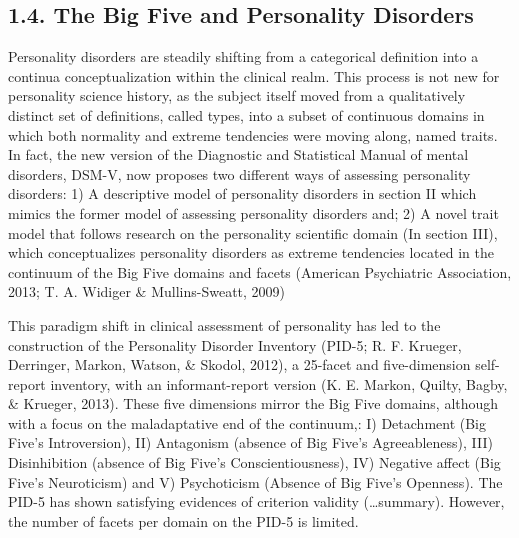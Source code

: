 \documentclass[,man,floatsintext]{apa6}
\begin{document}
\subsection{1.4. The Big Five and Personality
Disorders}\label{the-big-five-and-personality-disorders}

Personality disorders are steadily shifting from a categorical
definition into a continua conceptualization within the clinical realm.
This process is not new for personality science history, as the subject
itself moved from a qualitatively distinct set of definitions, called
types, into a subset of continuous domains in which both normality and
extreme tendencies were moving along, named traits. In fact, the new
version of the Diagnostic and Statistical Manual of mental disorders,
DSM-V, now proposes two different ways of assessing personality
disorders: 1) A descriptive model of personality disorders in section II
which mimics the former model of assessing personality disorders and; 2)
A novel trait model that follows research on the personality scientific
domain (In section III), which conceptualizes personality disorders as
extreme tendencies located in the continuum of the Big Five domains and
facets (American Psychiatric Association, 2013; T. A. Widiger \&
Mullins-Sweatt, 2009)

This paradigm shift in clinical assessment of personality has led to the
construction of the Personality Disorder Inventory (PID-5; R. F.
Krueger, Derringer, Markon, Watson, \& Skodol, 2012), a 25-facet and
five-dimension self-report inventory, with an informant-report version
(K. E. Markon, Quilty, Bagby, \& Krueger, 2013). These five dimensions
mirror the Big Five domains, although with a focus on the maladaptative
end of the continuum,: I) Detachment (Big Five's Introversion), II)
Antagonism (absence of Big Five's Agreeableness), III) Disinhibition
(absence of Big Five's Conscientiousness), IV) Negative affect (Big
Five's Neuroticism) and V) Psychoticism (Absence of Big Five's
Openness). The PID-5 has shown satisfying evidences of criterion
validity (\ldots{}summary). However, the number of facets per domain on
the PID-5 is limited.
\end{document}
